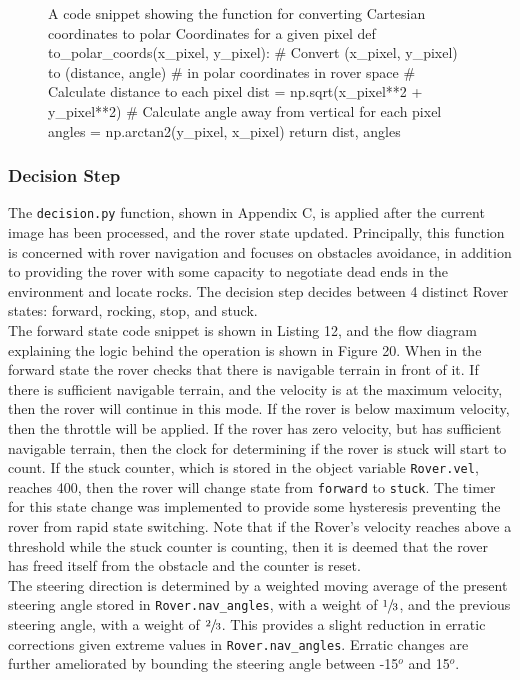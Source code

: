 \documentclass[a4paper]{article}
\begin{document}
\begin{figure}[h]\scriptsize
\begin{sexylisting}{A code snippet showing the function for converting Cartesian coordinates to polar Coordinates for a given pixel}
def to_polar_coords(x_pixel, y_pixel):
    # Convert (x_pixel, y_pixel) to (distance, angle) 
    # in polar coordinates in rover space
    # Calculate distance to each pixel
    dist = np.sqrt(x_pixel**2 + y_pixel**2)
    # Calculate angle away from vertical for each pixel
    angles = np.arctan2(y_pixel, x_pixel)
    return dist, angles
\end{sexylisting}
\end{figure}

\subsubsection{Decision Step}
The \verb|decision.py| function, shown in Appendix C, is applied after the current image has been processed, and the rover state updated. Principally, this function is concerned with rover navigation and focuses on obstacles avoidance, in addition to providing the rover with some capacity to negotiate dead ends in the environment and locate rocks. The decision step decides between 4 distinct Rover states: forward, rocking, stop, and stuck.\\

The forward state code snippet is shown in Listing 12, and the flow diagram explaining the logic behind the operation is shown in Figure 20. When in the forward state the rover checks that there is navigable terrain in front of it. If there is sufficient navigable terrain, and the velocity is at the maximum velocity, then the rover will continue in this mode. If the rover is below maximum velocity, then the throttle will be applied. If the rover has zero velocity, but has sufficient navigable terrain, then the clock for determining if the rover is stuck will start to count. If the stuck counter, which is stored in the object variable \verb|Rover.vel|, reaches 400, then the rover will change state from \verb|forward| to \verb|stuck|. The timer for this state change was implemented to provide some hysteresis preventing the rover from rapid state switching. Note that if the Rover's velocity reaches above a threshold while the stuck counter is counting, then it is deemed that the rover has freed itself from the obstacle and the counter is reset.\\

The steering direction is determined by a weighted moving average of the present steering angle stored in \verb|Rover.nav_angles|, with a weight of $\sfrac{1}{3}$, and the previous steering angle, with a weight of $\sfrac{2}{3}$. This provides a slight reduction in erratic corrections given extreme values in \verb|Rover.nav_angles|. Erratic changes are further ameliorated by bounding the steering angle between -15$^o$ and 15$^o$.
\end{document}
